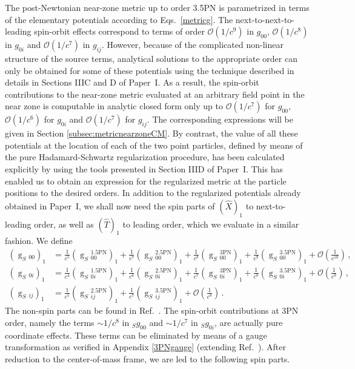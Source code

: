 \documentclass[
superscriptaddress,
preprint,
prd,tightenlines,showpacs,nofootinbib,
eqsecnum,
amsfonts,amsmath,amssymb]{revtex4-1}
\begin{document}
The post-Newtonian near-zone metric up to order 3.5PN is parametrized
in terms of the elementary potentials according to
Eqs.~\eqref{metricg}. The next-to-next-to-leading spin-orbit effects
correspond to terms of order $\mathcal{O}(1/c^9)$ in $g_{00}$,
$\mathcal{O}(1/c^8)$ in $g_{0i}$ and $\mathcal{O}(1/c^7)$ in
$g_{ij}$. However, because of the complicated non-linear structure of
the source terms, analytical solutions to the appropriate order can
only be obtained for some of these potentials using the technique
described in details in Sections IIIC and D of Paper~I. As a result,
the spin-orbit contributions to the near-zone metric evaluated at an
arbitrary field point in the near zone is computable in analytic
closed form only up to $\mathcal{O}(1/c^7)$ for $g_{00}$,
$\mathcal{O}(1/c^6)$ for $g_{0i}$ and $\mathcal{O}(1/c^7)$ for
$g_{ij}$. The corresponding expressions will be given in Section
\ref{subsec:metricnearzoneCM}. By contrast, the value of all these
potentials at the location of each of the two point particles, defined
by means of the pure Hadamard-Schwartz regularization procedure, has
been calculated explicitly by using the tools presented in Section
IIID of Paper~I. This has enabled us to obtain an expression for the
regularized metric at the particle positions to the desired orders. In
addition to the regularized potentials already obtained in Paper~I, we
shall now need the spin parts of $(\hat{X})_1$ to next-to-leading
order, as well as $(\hat{T})_1$ to leading order, which we evaluate in
a similar fashion. We define
%
\begin{subequations}
\begin{align}\label{g00Sen1structCM}
\left(\mathop{g}_{S}{}_{00}\right)_1 &=
\frac{1}{c^5}\left(\mathop{g}_{S}{}^{\!\mathrm{1.5PN}}_{00}\right)_1
+\frac{1}{c^7}\left(\mathop{g}_{S}{}^{\!\mathrm{2.5PN}}_{00}\right)_1
+\frac{1}{c^8}\left(\mathop{g}_{S}{}^{\!\mathrm{3PN}}_{00}\right)_1
+\frac{1}{c^9}\left(\mathop{g}_{S}{}^{\!\mathrm{3.5PN}}_{00}\right)_1
+ \mathcal{O}\left(\frac{1}{c^{10}}\right)\, ,\\
\label{g0iSen1structCM}
\left(\mathop{g}_{S}{}_{0i}\right)_1 &=
\frac{1}{c^4}\left(\mathop{g}_{S}{}^{\!\mathrm{1.5PN}}_{0i}\right)_1
+\frac{1}{c^6}\left(\mathop{g}_{S}{}^{\!\mathrm{2.5PN}}_{0i}\right)_1
+\frac{1}{c^7}\left(\mathop{g}_{S}{}^{\!\mathrm{3PN}}_{0i}\right)_1
+\frac{1}{c^8}\left(\mathop{g}_{S}{}^{\!\mathrm{3.5PN}}_{0i}\right)_1
+ \mathcal{O}\left(\frac{1}{c^{9}}\right)\,,\\
\label{gijSen1structCM}
\left(\mathop{g}_{S}{}_{ij}\right)_1 &=
\frac{1}{c^5}\left(\mathop{g}_{S}{}^{\!\mathrm{2.5PN}}_{ij}\right)_1
+\frac{1}{c^7}\left(\mathop{g}_{S}{}^{\!\mathrm{3.5PN}}_{ij}\right)_1
+ \mathcal{O}\left(\frac{1}{c^{8}}\right)\, .
\end{align}
\end{subequations}
%
The non-spin parts can be found in Ref.~\cite{Blanchet1998}. The
  spin-orbit contributions at 3PN order, namely the terms $\sim 1/c^8$
  in ${}_{S}g_{00}$ and $\sim 1/c^7$ in ${}_{S}g_{0i}$, are actually
  pure coordinate effects. These terms can be eliminated by means of a
  gauge transformation as verified in Appendix \ref{3PNgauge}
  (extending Ref.~\cite{Blanchet2011}). After reduction to the
center-of-mass frame, we are led to the following spin parts.
\end{document}
